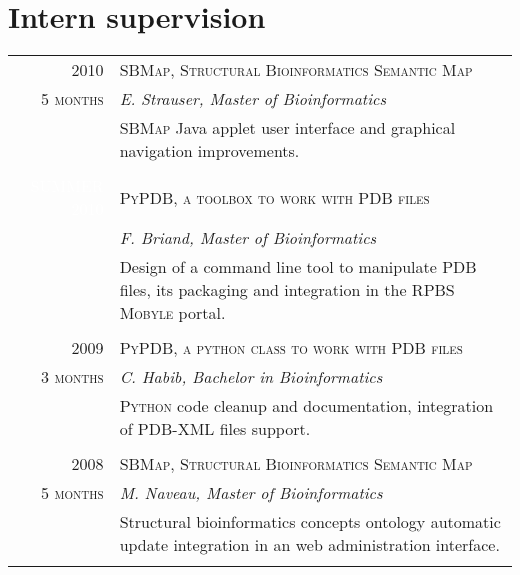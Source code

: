 \documentclass[a4paper,10pt]{article}
\begin{document}
  



\section{Intern supervision}
\begin{tabular}{r|p{11cm}}	
  
  \textsc{2010} & \textsc{SBMap, Structural Bioinformatics Semantic Map}\\
  \textsc{5 months} & \emph{E. Strauser, Master of Bioinformatics}\\
  & \footnotesize{\textsc{SBMap} Java applet user interface and graphical navigation improvements.}\\
  &\\
  \textsc{\textcolor{white}{SUMMER 2010}} & \textsc{PyPDB, a toolbox to work with PDB files}\\
  & \emph{F. Briand, Master of Bioinformatics}\\
  & \footnotesize{Design of a command line tool to manipulate \textsc{PDB} files, its packaging and integration in the RPBS \textsc{Mobyle} portal.}\\
  \multicolumn{2}{c}{} \\

  \textsc{2009} & \textsc{PyPDB, a python class to work with PDB files}\\
  \textsc{3 months} & \emph{C. Habib, Bachelor in Bioinformatics}\\
  & \footnotesize{\textsc{Python} code cleanup and documentation, integration of \textsc{PDB-XML} files support.}\\
  \multicolumn{2}{c}{} \\

  \textsc{2008} & \textsc{SBMap, Structural Bioinformatics Semantic Map}\\
  \textsc{5 months} & \emph{M. Naveau, Master of Bioinformatics}\\
  & \footnotesize{Structural bioinformatics concepts ontology automatic update integration in an web administration interface.}\\
  \multicolumn{2}{c}{} \\

\end{tabular}
\end{document}
